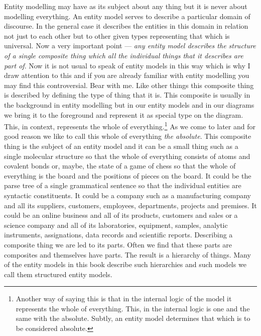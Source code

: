 \mynote Entity modelling may have as its subject about any thing but it is never about modelling everything.
An entity model serves to describe a particular domain of discourse. In the general case it describes the entities in this domain in relation not just to each other but to other given types representing that which is universal. 
\mynote
Now a very  important point ---
\textit{any entity model describes the structure of a single composite thing which all the individual things that it describes are part of}. Now it is not usual to speak of entity models in this way which is why I draw attention to this and if you are already familiar with entity modelling you may find this controversial. Bear with me.
\mynote
Like other things this composite thing is described by defining the type of thing that it is. This composite is usually in the background in entity modelling but in our entity models and in our diagrams we bring it to the foreground and represent it as special type on the diagram. 
This, in context, represents the whole of everything.\footnote{Another way of saying this is that in the internal logic of the model it represents the whole of everything. This, in the internal logic is one and the same with the absolute. Subtly, an entity model determines that which is to be considered absolute.} As we come to later and for good reason we like to call this whole of everything \textit{the absolute}.   This composite thing  is the subject of an entity model and it can be a small thing such as a single molecular structure so that the whole of everything consists of atoms and covalent bonds or, maybe, the state of a game of chess so that the whole of everything is the board and the positions of pieces on the board. It could be the parse tree of a single grammatical sentence 
so that the individual entities are syntactic constituents. 
It could be a company such as a manufacturing company and all its suppliers, customers, employees, departments, projects and premises. 
It could be an online business and all of its products, customers and sales or
a science company and all of its laboratories, equipment, samples, analytic instruments, assignations, data records and  scientific reports. 
\mynote
Describing a composite thing we are led to its parts. Often we find that these parts are composites and themselves have parts. The result is a hierarchy of things. Many of the  entity models in this book describe such hierarchies and such models we call them structured entity models.

